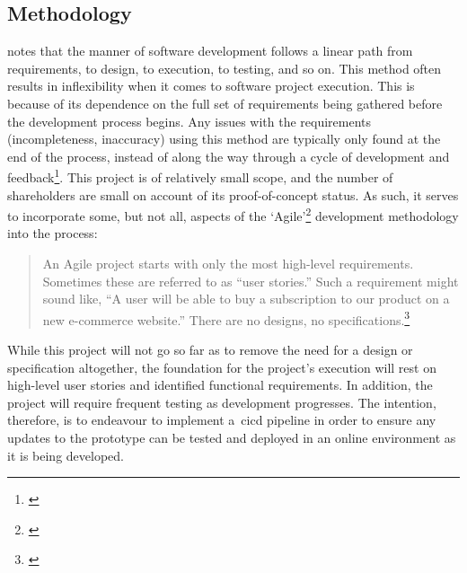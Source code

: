 \subsection{Methodology}\label{subsec:methodology}

\citet{murray-pm} notes that the  manner of software development follows a linear path from requirements, to design, to execution, to testing, and so on.
This method often results in inflexibility when it comes to software project execution.
This is because of its dependence on the full set of requirements being gathered before the development process begins.
Any issues with the requirements (incompleteness, inaccuracy) using this method are typically only found at the end of the process, instead of along the way through a cycle of development and feedback\footnote{\citep{murray-pm}}.
This project is of relatively small scope, and the number of shareholders are small on account of its proof-of-concept status.
As such, it serves to incorporate some, but not all, aspects of the `Agile'\footnote{\citep{beck2001agile}} development methodology into the process:

\begin{quotation}
    An Agile project starts with only the most high-level requirements.
    Sometimes these are referred to as “user stories.”
    Such a requirement might sound like, “A user will be able to buy a subscription to our product on a new e-commerce website.”
    There are no designs, no specifications.\footnote{\citep{murray-pm}}
\end{quotation}

While this project will not go so far as to remove the need for a design or specification altogether, the foundation for the project's execution will rest on high-level user stories and identified functional requirements.
In addition, the project will require frequent testing as development progresses.
The intention, therefore, is to endeavour to implement a~\gls{cicd} pipeline in order to ensure any updates to the prototype can be tested and deployed in an online environment as it is being developed.
